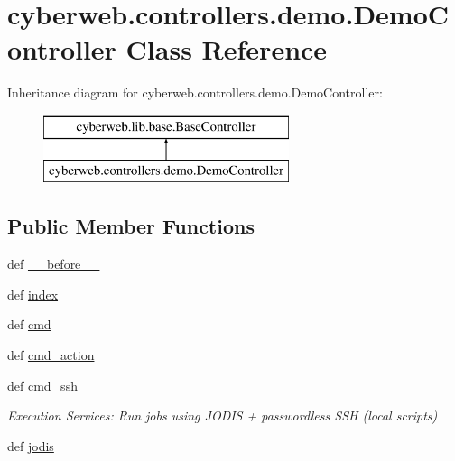 \hypertarget{classcyberweb_1_1controllers_1_1demo_1_1_demo_controller}{\section{cyberweb.\-controllers.\-demo.\-Demo\-Controller \-Class \-Reference}
\label{classcyberweb_1_1controllers_1_1demo_1_1_demo_controller}
}
\-Inheritance diagram for cyberweb.\-controllers.\-demo.\-Demo\-Controller\-:\begin{figure}[H]
\begin{center}
\leavevmode
\includegraphics[height=2.000000cm]{classcyberweb_1_1controllers_1_1demo_1_1_demo_controller}
\end{center}
\end{figure}
\subsection*{\-Public \-Member \-Functions}
\begin{DoxyCompactItemize}
\item 
def \hyperlink{classcyberweb_1_1controllers_1_1demo_1_1_demo_controller_ada47687b0a7cfab587686a0abd5deacd}{\-\_\-\-\_\-before\-\_\-\-\_\-}
\item 
def \hyperlink{classcyberweb_1_1controllers_1_1demo_1_1_demo_controller_aac0ed2ea58ac3ce803bb30e7c0ce7517}{index}
\item 
def \hyperlink{classcyberweb_1_1controllers_1_1demo_1_1_demo_controller_a61c50c6b024cb4dfa796ac109006e4eb}{cmd}
\item 
def \hyperlink{classcyberweb_1_1controllers_1_1demo_1_1_demo_controller_ad74d889bb17d1eb8a96fd315b5d72140}{cmd\-\_\-action}
\item 
def \hyperlink{classcyberweb_1_1controllers_1_1demo_1_1_demo_controller_a203b627e023606d2918e4fc1e3b21deb}{cmd\-\_\-ssh}
\begin{DoxyCompactList}\small\item\em \-Execution \-Services\-: \-Run jobs using \-J\-O\-D\-I\-S + passwordless \-S\-S\-H (local scripts) \end{DoxyCompactList}\item 
def \hyperlink{classcyberweb_1_1controllers_1_1demo_1_1_demo_controller_adc435eec0097d22554c62774b9d7e4e6}{jodis}
\end{DoxyCompactItemize}


